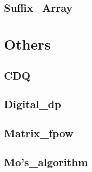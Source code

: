     \subsection{Suffix\_Array}
        

\section{Others}
    \subsection{CDQ}
        
    \subsection{Digital\_dp}
        
    \subsection{Matrix\_fpow}
        
    \subsection{Mo's\_algorithm}
        
    